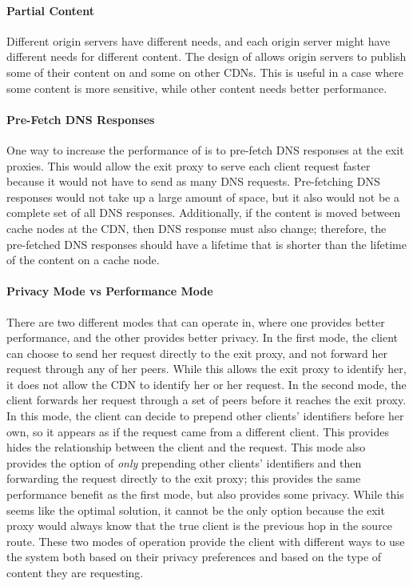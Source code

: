 \paragraph{Partial Content}
Different origin servers have different needs, and each origin server might 
have different needs for different content.  The design of \system{} allows origin servers
 to publish some of their content on \system{} and some on other CDNs.  
This is useful in a case where some content is more sensitive, while other content needs 
better performance.

\paragraph{Pre-Fetch DNS Responses} 
One way to increase the performance of \system{} is to pre-fetch DNS responses at 
the exit proxies.  This would allow the exit proxy to serve each client request faster 
because it would not have to send as many DNS requests.  Pre-fetching DNS responses would 
not take up a large amount of space, but it also would not be a complete set of all DNS 
responses.  Additionally, if the content is moved between cache nodes at the CDN, then DNS 
response must also change; therefore, the pre-fetched DNS responses should have a lifetime 
that is shorter than the lifetime of the content on a cache node.

\paragraph{Privacy Mode vs Performance Mode}
There are two different modes that \system{} can operate in, where one provides better 
performance, and the other provides better privacy.  In the first mode, the client can 
choose to send her request directly to the exit proxy, and not forward her request through 
any of her peers.  While this allows the exit proxy to identify her, it does not allow the 
CDN to identify her or her request.  In the second mode, the client forwards her request 
through a set of peers before it reaches the exit proxy.  In this mode, the client can decide 
to prepend other clients' identifiers before her own, so it appears as if the request came from 
a different client.  This provides hides the relationship between the client and the request.  This mode 
also provides the option of {\it only} prepending other clients' identifiers and then forwarding 
the request directly to the exit proxy; this provides the same performance benefit as the first 
mode, but also provides some privacy.  While this seems like the optimal solution, it cannot be 
the only option because the exit proxy would always know that the true client is the previous hop 
in the source route.  These two modes of operation provide the client with different ways to use 
the system both based on their privacy preferences and based on the type of content they are requesting.

